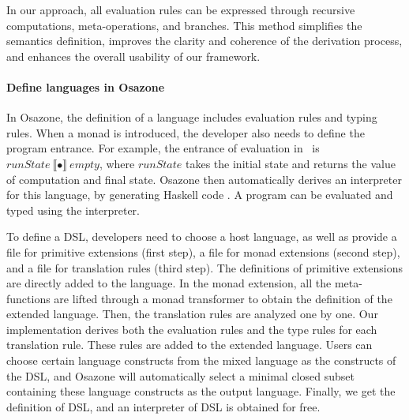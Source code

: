 In our approach, all evaluation rules can be expressed through recursive computations, meta-operations, and branches.
This method simplifies the semantics definition, 
 improves the clarity and coherence of the derivation process, 
 and enhances the overall usability of our framework.


\paragraph{Define languages in Osazone}

In Osazone, the definition of a language includes evaluation rules and typing rules. When a monad is introduced, the {developer} also needs to define the program entrance. For example, the entrance of evaluation in \Func\ is $\mathit{runState}~ \llbracket \bullet \rrbracket ~\mathit{empty}$, where $\mathit{runState}$ takes the initial state and returns the value of computation and final state. Osazone then {automatically derives} an interpreter for this language, by generating Haskell code . A program can be evaluated and typed using the interpreter.

To define a DSL, {developers} need to choose a host language, as well as provide 
  a file for primitive extensions (first step), 
  a file for monad extensions (second step),
  and a file for translation rules (third step).
The definitions of primitive extensions are directly added to the language. In the monad extension, all the meta-functions are lifted through a monad transformer to obtain the definition of the extended language. Then, the translation rules are analyzed one by one. Our implementation derives both the evaluation rules and the type rules for each translation rule. These rules are added to the extended language. Users can choose certain language constructs from the mixed language as the constructs of the DSL, and Osazone will automatically select a minimal closed subset containing these language constructs as the output language. Finally, we get the definition of DSL, and an interpreter of DSL is obtained for free.

